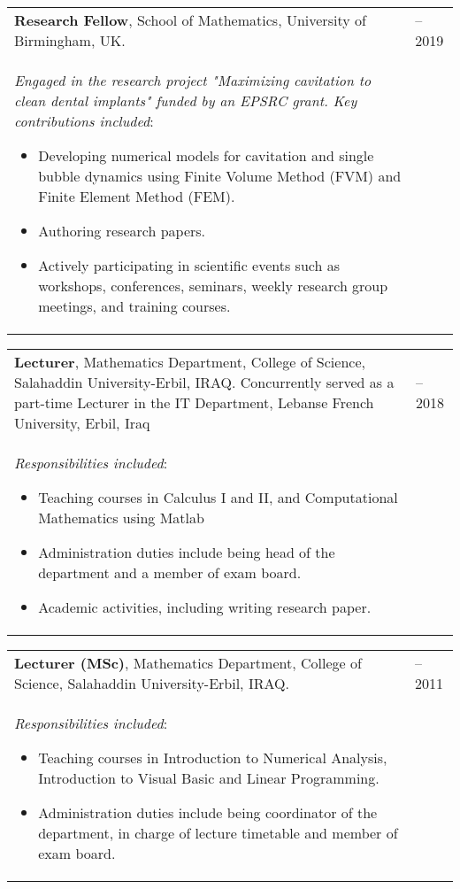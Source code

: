 \documentclass[line]{res}
\newenvironment{p1}
{\begin{adjustwidth}{-30pt}{0pt}
\vspace{8pt}}
{\end{adjustwidth}}
\begin{document}
\begin{resume}
\begin{p1}
\begin{tabular}{p{} >{\raggedleft\arraybackslash}p{}}
	\textbf{Research Fellow}, School of Mathematics, University of Birmingham, UK. & 2018--2019 \\
	\textit{Engaged in the research project "Maximizing cavitation to clean dental implants" funded by an EPSRC grant. Key contributions included}:
	\begin{itemize}
		\item Developing numerical models for cavitation and single bubble dynamics using Finite Volume Method (FVM) and Finite Element Method (FEM).
		\item Authoring research papers.
		\item Actively participating in scientific events such as workshops, conferences, seminars, weekly research group meetings, and training courses.
	\end{itemize}
\end{tabular}
\vspace{3pt}
\begin{tabular}{p{} >{\raggedleft\arraybackslash}p{}}
	\textbf{Lecturer}, Mathematics Department, College of Science, Salahaddin University-Erbil, IRAQ.  Concurrently served as a part-time Lecturer in the IT Department, Lebanse French University, Erbil, Iraq& 2015--2018 \\
	\textit{Responsibilities included}:
	\begin{itemize}
		\item Teaching courses in Calculus I and II, and Computational Mathematics using Matlab
		\item Administration duties include being head of the department and a member of exam board.
		\item Academic activities, including writing research paper.	
	\end{itemize}
\end{tabular}

\vspace{2pt}
\begin{tabular}{p{} >{\raggedleft\arraybackslash}p{}}
	\textbf{Lecturer (MSc)}, Mathematics Department, College of Science, Salahaddin University-Erbil, IRAQ.  & 2007--2011 \\
	\textit{Responsibilities included}:
	\begin{itemize}
		\item Teaching courses in Introduction to Numerical Analysis, Introduction to Visual Basic and Linear Programming.
		\item Administration duties include being coordinator of the department, in charge of lecture timetable and member of exam board.
	\end{itemize}
\end{tabular}
\end{p1}




\end{resume}
\end{document}
